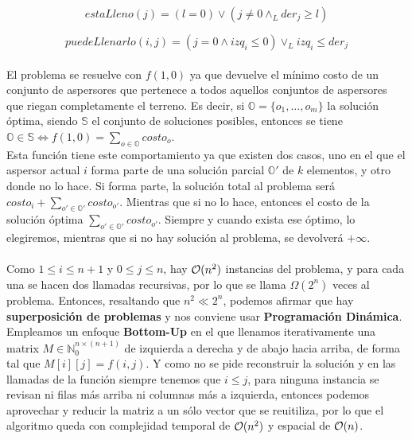 \documentclass[./main.tex]{subfiles}
\begin{document}
\begin{equation}
 estaLleno(j) = (l = 0) \lor (j \neq 0 \land_L der_j \geq l)
\end{equation}

\begin{equation}
 puedeLlenarlo(i, j) = (j = 0 \land izq_i \leq 0) \lor_L izq_i \leq der_j
\end{equation}

\paragraph{} El problema se resuelve con \(f(1, 0)\) ya que devuelve el mínimo costo de un conjunto de aspersores que pertenece a todos aquellos conjuntos de aspersores que riegan completamente el terreno. Es decir, si \(\mathbb{O} = \{o_1, \ldots, o_m\}\) la solución óptima, siendo \(\mathbb{S}\) el conjunto de soluciones posibles, entonces se tiene \(\mathbb{O} \in \mathbb{S} \iff f(1, 0) = \sum_{o \in \mathbb{O}}costo_o\). \\
Esta función tiene este comportamiento ya que existen dos casos, uno en el que el aspersor actual \(i\) forma parte de una solución parcial \(\mathbb{O}'\) de \(k\) elementos, y otro donde no lo hace. Si forma parte, la solución total al problema será \(costo_i + \sum_{o' \in \mathbb{O}'}costo_{o'}\). Mientras que si no lo hace, entonces el costo de la solución óptima \(\sum_{o' \in \mathbb{O}'}costo_{o'}\). Siempre y cuando exista ese óptimo, lo elegiremos, mientras que si no hay solución al problema, se devolverá \(+\infty\).

\paragraph{} Como \(1 \leq i \leq n+1\) y \(0 \leq j \leq n\), hay \(\mathcal{O}(n^2)\) instancias del problema, y para cada una se hacen dos llamadas recursivas, por lo que se llama \(\Omega(2^n)\) veces al problema. Entonces, resaltando que \(n^2 \ll 2^n\), podemos afirmar que hay \textbf{superposición de problemas} y nos conviene usar \textbf{Programación Dinámica}. \\
Empleamos un enfoque \textbf{Bottom-Up} en el que llenamos iterativamente una matrix \(M \in \mathbb{N}_0^{n \times (n+1)}\) de izquierda a derecha y de abajo hacia arriba, de forma tal que \(M[i][j] = f(i, j)\). Y como no se pide reconstruir la solución y en las llamadas de la función siempre tenemos que \(i \leq j\), para ninguna instancia se revisan ni filas más arriba ni columnas más a izquierda, entonces podemos aprovechar y reducir la matriz a un sólo vector que se reuitiliza, por lo que el algoritmo queda con complejidad temporal de \(\mathcal{O}(n^2)\) y espacial de \(\mathcal{O}(n)\).
\end{document}
